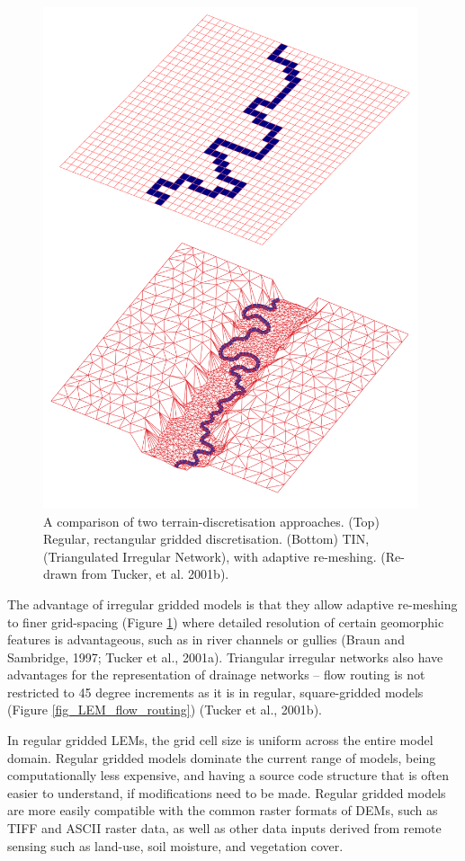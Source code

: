 \begin{figure}[t]
\includegraphics[width=11cm]{LEMFinalRevisedmanuscriptDAVFinalrevisions-img/LEMFinalRevisedmanuscriptDAVFinalrevisions-img005.png} 
\caption{A comparison of two terrain-discretisation approaches. (Top) Regular, rectangular gridded discretisation. (Bottom) TIN, (Triangulated Irregular Network), with adaptive re-meshing. (Re-drawn from Tucker, et al. 2001b).}
\label{fig_LEM_discretisation}
\end{figure}

The advantage of irregular gridded models is that they allow adaptive re-meshing to finer grid-spacing (Figure \ref{fig_LEM_discretisation}) where detailed resolution of certain geomorphic features is advantageous, such as in river channels or gullies (Braun and Sambridge, 1997; Tucker et al., 2001a). Triangular irregular networks also have advantages for the representation of drainage networks – flow routing is not restricted to 45 degree increments as it is in regular, square-gridded models (Figure \ref{fig_LEM_flow_routing}) (Tucker et al., 2001b).

In regular gridded LEMs, the grid cell size is uniform across the entire model domain. Regular gridded models dominate the current range of models, being computationally less expensive, and having a source code structure that is often easier to understand, if modifications need to be made. Regular gridded models are more easily compatible with the common raster formats of DEMs, such as TIFF and ASCII raster data, as well as other data inputs derived from remote sensing such as land-use, soil moisture, and vegetation cover.

